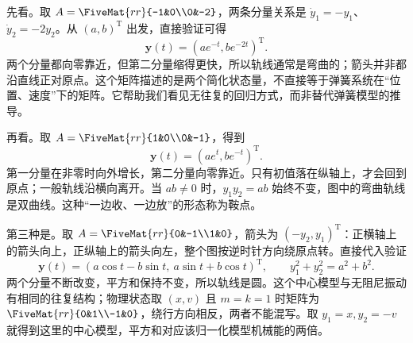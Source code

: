 \documentclass[a4paper,12pt,twoside,openany,fontset=none]{ctexbook}
\numberwithin{equation}{chapter}
\begin{document}
先看。取 $A=\FiveMat{rr}{-1&0\\0&-2}$，两条分量关系是 $\dot y_1=-y_1$、$\dot y_2=-2y_2$。从 $(a,b)^{\mathrm T}$ 出发，直接验证可得
\begin{equation}
 \boldsymbol y(t)=(ae^{-t},be^{-2t})^{\mathrm T}.
\end{equation}
两个分量都向零靠近，但第二分量缩得更快，所以轨线通常是弯曲的；箭头并非都沿直线正对原点。这个矩阵描述的是两个简化状态量，不直接等于弹簧系统在“位置、速度”下的矩阵。它帮助我们看见无往复的回归方式，而非替代弹簧模型的推导。


再看。取 $A=\FiveMat{rr}{1&0\\0&-1}$，得到
\begin{equation}
 \boldsymbol y(t)=(ae^t,be^{-t})^{\mathrm T}.
\end{equation}
第一分量在非零时向外增长，第二分量向零靠近。只有初值落在纵轴上，才会回到原点；一般轨线沿横向离开。当 $ab\ne0$ 时，$y_1y_2=ab$ 始终不变，图中的弯曲轨线是双曲线。这种“一边收、一边放”的形态称为鞍点。


第三种是。取 $A=\FiveMat{rr}{0&-1\\1&0}$，箭头为 $(-y_2,y_1)^{\mathrm T}$：正横轴上的箭头向上，正纵轴上的箭头向左，整个图按逆时针方向绕原点转。直接代入验证
\begin{equation}
 \boldsymbol y(t)=
 (a\cos t-b\sin t,\ a\sin t+b\cos t)^{\mathrm T},\qquad
 y_1^2+y_2^2=a^2+b^2.
\end{equation}
两个分量不断改变，平方和保持不变，所以轨线是圆。这个中心模型与无阻尼振动有相同的往复结构；物理状态取 $(x,v)$ 且 $m=k=1$ 时矩阵为 $\FiveMat{rr}{0&1\\-1&0}$，绕行方向相反，两者不能混写。取 $y_1=x,y_2=-v$ 就得到这里的中心模型，平方和对应该归一化模型机械能的两倍。
\end{document}
